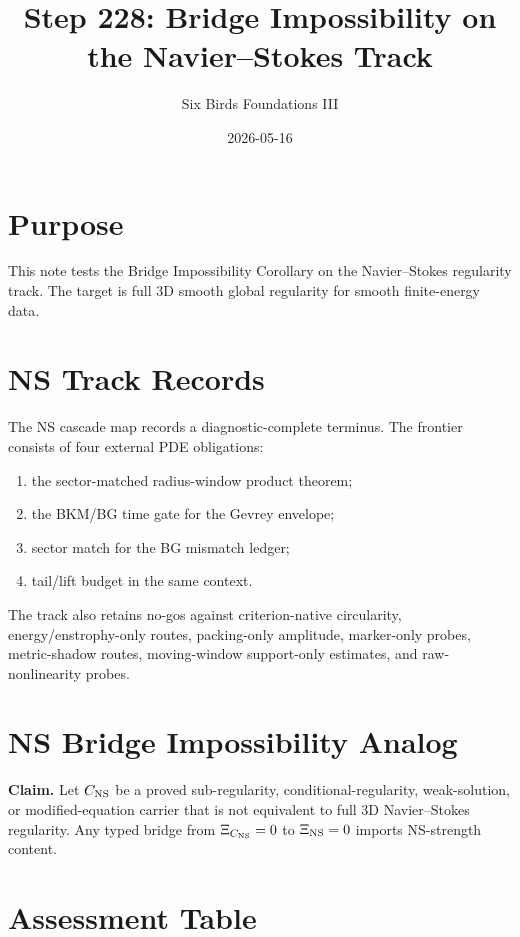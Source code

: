 \documentclass{article}
\title{Step 228: Bridge Impossibility on the Navier--Stokes Track}
\author{Six Birds Foundations III}
\date{2026-05-16}
\begin{document}
\maketitle

\section{Purpose}

This note tests the Bridge Impossibility Corollary on the Navier--Stokes regularity track. The target is full 3D smooth global regularity for smooth finite-energy data.

\section{NS Track Records}

The NS cascade map records a diagnostic-complete terminus. The frontier consists of four external PDE obligations:
\begin{enumerate}
\item the sector-matched radius-window product theorem;
\item the BKM/BG time gate for the Gevrey envelope;
\item sector match for the BG mismatch ledger;
\item tail/lift budget in the same context.
\end{enumerate}

The track also retains no-gos against criterion-native circularity, energy/enstrophy-only routes, packing-only amplitude, marker-only probes, metric-shadow routes, moving-window support-only estimates, and raw-nonlinearity probes.

\section{NS Bridge Impossibility Analog}

\textbf{Claim.} Let \(C_{\rm NS}\) be a proved sub-regularity, conditional-regularity, weak-solution, or modified-equation carrier that is not equivalent to full 3D Navier--Stokes regularity. Any typed bridge from \(\Xi_{C_{\rm NS}}=0\) to \(\Xi_{\rm NS}=0\) imports NS-strength content.

\section{Assessment Table}
\end{document}
